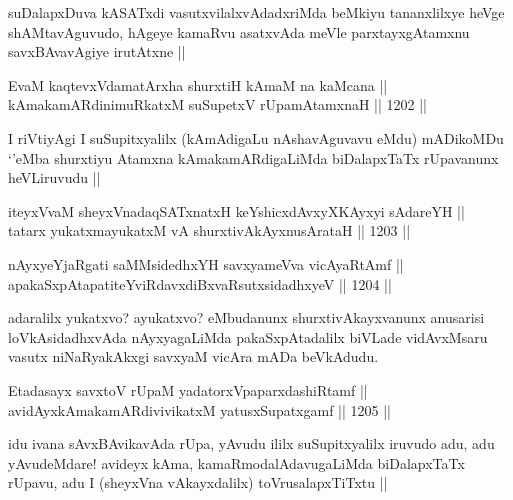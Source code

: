 \begin{artha}
suDalapxDuva kASATxdi vasutxvilalxvAdadxriMda beMkiyu tananxlilxye heVge shAMtavAguvudo, hAgeye kamaRvu asatxvAda meVle parxtayxgAtamxnu savxBAvavAgiye irutAtxne ||
\end{artha}

\begin{shl}
EvaM kaqtevxVdamatArx\s \s ha shurxtiH kAmaM na kaMcana || \\
kAmakamARdinimuRkatxM suSupetxV rUpamAtamxnaH ||  1202 ||  
\end{shl}

\begin{artha}
I riVtiyAgi I suSupitxyalilx (kAmAdigaLu nAshavAguvavu eMdu) mADikoMDu `\stext'eMba shurxtiyu Atamxna kAmakamARdigaLiMda biDalapxTaTx rUpavanunx heVLiruvudu ||
\end{artha}


\begin{shl}
iteyxVvaM sheyxVnadaqSATxnatxH keYshicxdAvxyXKAyxyi sAdareYH || \\
tatarx yukatxmayukatxM vA shurxtivAkAyxnusArataH ||  1203 ||  
\end{shl}

\begin{shl}
nAyxyeYjaRgati saMMsidedhxYH savxyameVva vicAyaRtAmf || \\
apakaSxpAtapatiteYviRdavxdiBxvaRsutxsidadhxyeV ||  1204 ||  
\end{shl}

\begin{artha}
adaralilx yukatxvo? ayukatxvo? eMbudanunx shurxtivAkayxvanunx anusarisi loVkAsidadhxvAda nAyxyagaLiMda pakaSxpAtadalilx biVLade vidAvxMsaru vasutx niNaRyakAkxgi savxyaM vicAra mADa beVkAdudu.
\end{artha}


\begin{shl}
Etadasayx savxtoV rUpaM yadatorxVpaparxdashiRtamf || \\
avidAyxkAmakamARdivivikatxM yatusxSupatxgamf ||  1205 ||  
\end{shl}

\begin{artha}
idu ivana sAvxBAvikavAda rUpa, yAvudu ililx suSupitxyalilx iruvudo adu, adu yAvudeMdare! avideyx kAma, kamaRmodalAdavugaLiMda biDalapxTaTx rUpavu, adu I (sheyxVna vAkayxdalilx) toVrusalapxTiTxtu ||
\end{artha}

